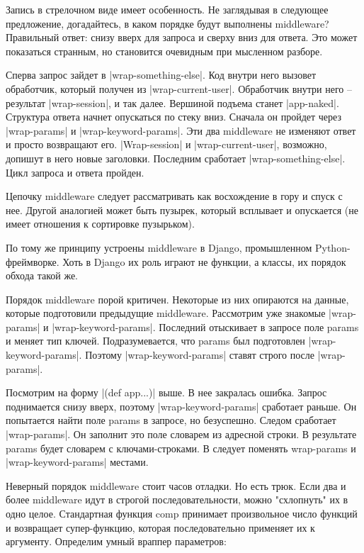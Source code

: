 Запись в стрелочном виде имеет особенность. Не заглядывая в следующее
предложение, догадайтесь, в каком порядке будут выполнены middleware? Правильный
ответ: снизу вверх для запроса и сверху вниз для ответа. Это может показаться
странным, но становится очевидным при мысленном разборе.

Сперва запрос зайдет в \spverb|wrap-something-else|. Код внутри него вызовет
обработчик, который получен из \spverb|wrap-current-user|. Обработчик внутри него –
результат \spverb|wrap-session|, и так далее. Вершиной подъема станет
\spverb|app-naked|. Структура ответа начнет опускаться по стеку вниз. Сначала он
пройдет через \spverb|wrap-params| и \spverb|wrap-keyword-params|. Эти два middleware не
изменяют ответ и просто возвращают его. \spverb|Wrap-session| и \spverb|wrap-current-user|,
возможно, допишут в него новые заголовки. Последним сработает
\spverb|wrap-something-else|. Цикл запроса и ответа пройден.

Цепочку middleware следует рассматривать как восхождение в гору и спуск с
нее. Другой аналогией может быть пузырек, который всплывает и опускается (не
имеет отношения к сортировке пузырьком).

По тому же принципу устроены middleware в Django, промышленном
Python-фреймворке. Хоть в Django их роль играют не функции, а классы, их порядок
обхода такой же.

Порядок middleware порой критичен. Некоторые из них опираются на данные, которые
подготовили предыдущие middleware. Рассмотрим уже знакомые \spverb|wrap-params| и
\spverb|wrap-keyword-params|. Последний отыскивает в запросе поле params и меняет тип
ключей. Подразумевается, что params был подготовлен
\spverb|wrap-keyword-params|. Поэтому \spverb|wrap-keyword-params| ставят строго после
\spverb|wrap-params|.

Посмотрим на форму \spverb|(def app...)| выше. В нее закралась ошибка. Запрос
поднимается снизу вверх, поэтому \spverb|wrap-keyword-params| сработает раньше. Он
попытается найти поле params в запросе, но безуспешно. Следом сработает
\spverb|wrap-params|. Он заполнит это поле словарем из адресной строки. В результате
params будет словарем с ключами-строками. В следует поменять wrap-params и
\spverb|wrap-keyword-params| местами.

Неверный порядок middleware стоит часов отладки. Но есть трюк. Если два и более
middleware идут в строгой последовательности, можно "схлопнуть" их в одно
целое. Стандартная функция comp принимает произвольное число функций и
возвращает супер-функцию, которая последовательно применяет их к
аргументу. Определим умный враппер параметров:


